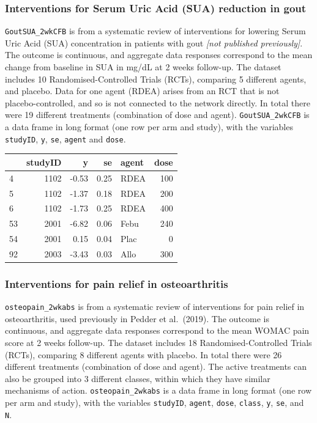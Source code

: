 \documentclass[]{article}
\begin{document}
\hypertarget{interventions-for-serum-uric-acid-sua-reduction-in-gout}{%
\subsubsection{Interventions for Serum Uric Acid (SUA) reduction in
gout}\label{interventions-for-serum-uric-acid-sua-reduction-in-gout}}

\texttt{GoutSUA\_2wkCFB} is from a systematic review of interventions
for lowering Serum Uric Acid (SUA) concentration in patients with gout
\emph{{[}not published previously{]}}. The outcome is continuous, and
aggregate data responses correspond to the mean change from baseline in
SUA in mg/dL at 2 weeks follow-up. The dataset includes 10
Randomised-Controlled Trials (RCTs), comparing 5 different agents, and
placebo. Data for one agent (RDEA) arises from an RCT that is not
placebo-controlled, and so is not connected to the network directly. In
total there were 19 different treatments (combination of dose and
agent). \texttt{GoutSUA\_2wkCFB} is a data frame in long format (one row
per arm and study), with the variables \texttt{studyID}, \texttt{y},
\texttt{se}, \texttt{agent} and \texttt{dose}.

\begin{longtable}[]{@{}lrrrlr@{}}
\toprule
& studyID & y & se & agent & dose\tabularnewline
\midrule
\endhead
4 & 1102 & -0.53 & 0.25 & RDEA & 100\tabularnewline
5 & 1102 & -1.37 & 0.18 & RDEA & 200\tabularnewline
6 & 1102 & -1.73 & 0.25 & RDEA & 400\tabularnewline
53 & 2001 & -6.82 & 0.06 & Febu & 240\tabularnewline
54 & 2001 & 0.15 & 0.04 & Plac & 0\tabularnewline
92 & 2003 & -3.43 & 0.03 & Allo & 300\tabularnewline
\bottomrule
\end{longtable}

\hypertarget{interventions-for-pain-relief-in-osteoarthritis}{%
\subsubsection{Interventions for pain relief in
osteoarthritis}\label{interventions-for-pain-relief-in-osteoarthritis}}

\texttt{osteopain\_2wkabs} is from a systematic review of interventions
for pain relief in osteoarthritis, used previously in Pedder et
al.~(2019). The outcome is continuous, and aggregate data responses
correspond to the mean WOMAC pain score at 2 weeks follow-up. The
dataset includes 18 Randomised-Controlled Trials (RCTs), comparing 8
different agents with placebo. In total there were 26 different
treatments (combination of dose and agent). The active treatments can
also be grouped into 3 different classes, within which they have similar
mechanisms of action. \texttt{osteopain\_2wkabs} is a data frame in long
format (one row per arm and study), with the variables \texttt{studyID},
\texttt{agent}, \texttt{dose}, \texttt{class}, \texttt{y}, \texttt{se},
and \texttt{N}.
\end{document}
